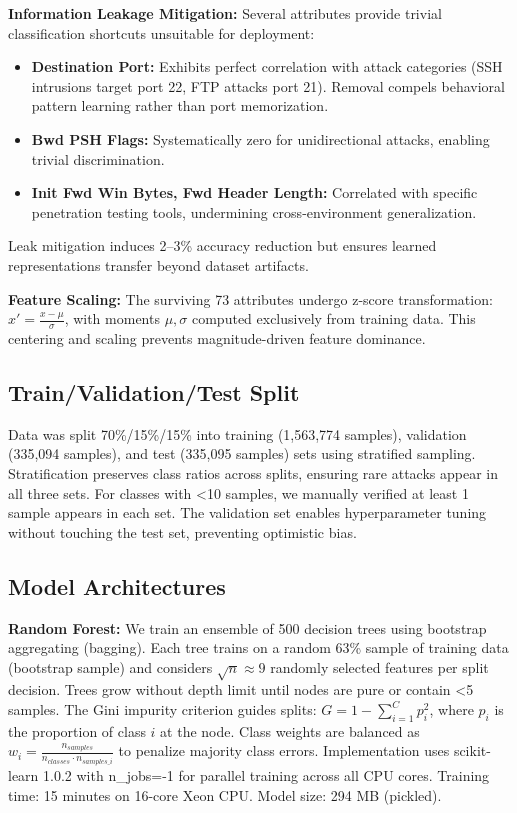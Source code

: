 \documentclass[10pt,twocolumn]{article}
\begin{document}
\textbf{Information Leakage Mitigation:} Several attributes provide trivial classification shortcuts unsuitable for deployment:
\begin{itemize}
    \item \textbf{Destination Port:} Exhibits perfect correlation with attack categories (SSH intrusions target port 22, FTP attacks port 21). Removal compels behavioral pattern learning rather than port memorization.
    \item \textbf{Bwd PSH Flags:} Systematically zero for unidirectional attacks, enabling trivial discrimination.
    \item \textbf{Init Fwd Win Bytes, Fwd Header Length:} Correlated with specific penetration testing tools, undermining cross-environment generalization.
\end{itemize}

Leak mitigation induces 2--3\% accuracy reduction but ensures learned representations transfer beyond dataset artifacts.

\textbf{Feature Scaling:} The surviving 73 attributes undergo z-score transformation: $x' = \frac{x - \mu}{\sigma}$, with moments $\mu, \sigma$ computed exclusively from training data. This centering and scaling prevents magnitude-driven feature dominance.

\subsection{Train/Validation/Test Split}

Data was split 70\%/15\%/15\% into training (1,563,774 samples), validation (335,094 samples), and test (335,095 samples) sets using stratified sampling. Stratification preserves class ratios across splits, ensuring rare attacks appear in all three sets. For classes with <10 samples, we manually verified at least 1 sample appears in each set. The validation set enables hyperparameter tuning without touching the test set, preventing optimistic bias.

\subsection{Model Architectures}

\textbf{Random Forest:} We train an ensemble of 500 decision trees using bootstrap aggregating (bagging). Each tree trains on a random 63\% sample of training data (bootstrap sample) and considers $\sqrt{n} \approx 9$ randomly selected features per split decision. Trees grow without depth limit until nodes are pure or contain <5 samples. The Gini impurity criterion guides splits: $G = 1 - \sum_{i=1}^{C} p_i^2$, where $p_i$ is the proportion of class $i$ at the node. Class weights are balanced as $w_i = \frac{n_{samples}}{n_{classes} \cdot n_{samples\_i}}$ to penalize majority class errors. Implementation uses scikit-learn 1.0.2 with n\_jobs=-1 for parallel training across all CPU cores. Training time: 15 minutes on 16-core Xeon CPU. Model size: 294 MB (pickled).
\end{document}
